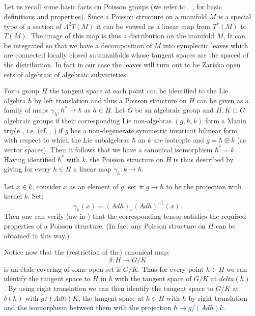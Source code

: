\subsection{}\label{art4-subsec-4.2}
Let us recall some basic facts on Poisson groups (we refer to \cite{art4-keyD}, \cite{art4-keySTS}, \cite{art4-keyLW} for basic definitions and properties). Since a Poisson structure on a manifold $M$  is a special type of a section of
$\Lambda^{2}T(M)$ it can be viewed as a linear map from $T^{*}(M)$ to $T(M)$. The image of this map is thus a distribution on the manifold $M$, It can be integrated so that we have a decomposition of $M$ into symplectic leaves which are connected locally closed submanifolds whose tangent spaces are the spaced of the distribution. In fact in our case the leaves will turn out to be Zarisko open sets of algebraic of algebraic subvarieties.

For a group $H$ the tangent space at each point can be identified to the Lie algebra $\hbar$ by left translation and thus a Poisson structure on $H$ can be given as a family of maps $\gamma_{h} : \hbar^{*} \rightarrow \hbar$ as $h \in H$. Let $G$ be an algebraic group and $H, K \subset G$ algebraic groups if their corresponding Lie non-algebras $(g, \hbar, k)$
form a Manin triple , i.e. (cf. \cite{art4-keyD}, \cite{art4-keyLW}) if $g$ has a non-degenerate,symmetric invariant bilinear form with respect to which the Lie subalgebras $\hbar$ an $k$ are isotropic and $g=\hbar \oplus k$ (as vector spaces). Then it follows that we have a canonical isomorphism $\hbar^{*} =k$. Having identified $\hbar^{*}$ with $k$, the Poisson structure on $H$ is thus described by giving for every $h\in H $ a linear map $\gamma_{h} : k \rightarrow \hbar$.  

Let $x\in k$, consider $x$ as an element of $g$, set $\pi : g \rightarrow \hbar$ to be the projection with kernel $k$. Set:
$$
\gamma_{h}(x) = (Adh)_{\pi}(Adh)^{-1}(x).
$$
Then one can verify (aw in \cite{ref-keyLW}) that the corresponding tensor satisfies the required properties of a Poisson structure. (In fact any Poisson structure on $H$ can be obtained in this way.)

Notice now that the (restriction of the) canonical map:
$$
\delta: H\rightarrow G/K
$$
is an \'etale covering of some open set is $G/K$. Thus for every point $h\in H$ we can identify the tangent space to $H$ in $h$ with the tangent space of $G/K$ at $delta(h)$. By using right translation we can then identify the tangent space to $G/K$ at $\delta(h)$ with $g/(Adh)K$, the tangent space at $h\in H$ with $\hbar$ by right translation and the isomorphism between them with the projection $\hbar \rightarrow g/(Adh)k$. 

